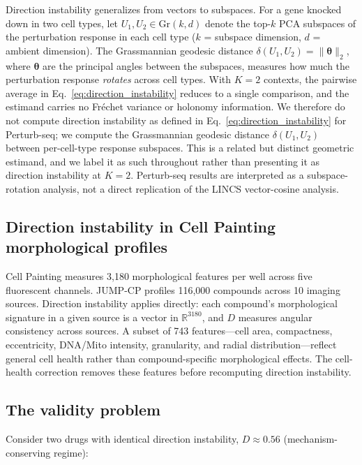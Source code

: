 \documentclass[11pt]{article}
\begin{document}
Direction instability generalizes from vectors to subspaces. For a gene
knocked down in two cell types, let $U_1, U_2 \in \text{Gr}(k, d)$ denote
the top-$k$ PCA subspaces of the perturbation response in each cell type
($k$ = subspace dimension, $d$ = ambient dimension).
The Grassmannian geodesic distance $\delta(U_1, U_2) =
\|\boldsymbol{\theta}\|_2$, where $\boldsymbol{\theta}$ are the principal
angles between the subspaces, measures how much the perturbation response
\emph{rotates} across cell types. With $K = 2$ contexts, the pairwise
average in Eq.~\ref{eq:direction_instability} reduces to a single
comparison, and the estimand carries no Fr\'{e}chet variance or holonomy
information. We therefore do not compute direction instability as defined
in Eq.~\ref{eq:direction_instability} for Perturb-seq; we compute the
Grassmannian geodesic distance $\delta(U_1, U_2)$ between per-cell-type
response subspaces. This is a related but distinct geometric estimand, and
we label it as such throughout rather than presenting it as direction
instability at $K = 2$. Perturb-seq results are interpreted as a
subspace-rotation analysis, not a direct replication of the LINCS
vector-cosine analysis.

\subsection{Direction instability in Cell Painting morphological profiles}

Cell Painting \citep{bray2016cell,chandrasekaran2023jump} measures 3{,}180 morphological
features per well across five fluorescent channels. JUMP-CP
profiles 116{,}000 compounds across 10 imaging sources. Direction
instability applies directly: each compound's morphological signature in a
given source is a vector in $\mathbb{R}^{3180}$, and $D$ measures angular
consistency across sources. A subset of 743 features---cell area, compactness,
eccentricity, DNA/Mito intensity, granularity, and radial
distribution---reflect general cell health rather than compound-specific
morphological effects. The cell-health correction removes these features
before recomputing direction instability.

\subsection{The validity problem}

Consider two drugs with identical direction instability, $D \approx 0.56$
(mechanism-conserving regime):
\end{document}
